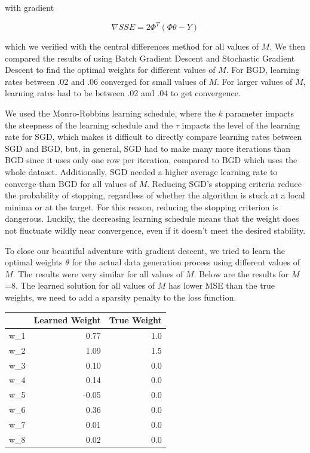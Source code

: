 \documentclass[10pt]{article}
\begin{document}
with gradient 

\begin{equation*}
	\nabla SSE = 2\Phi^T(\Phi \theta-Y)
\end{equation*}

 which we verified with the central differences method for all values of $M$. We then compared the results of using Batch Gradient Descent and Stochastic Gradient Descent to find the optimal weights for different values of $M$. For BGD, learning rates between .02 and .06 converged for small values of $M$. For larger values of $M$,  learning rates had to be between .02 and .04 to get convergence.
 
We used the Monro-Robbins learning schedule, where  the $k$ parameter impacts the steepness of the learning schedule and the $\tau$ impacts the level of the learning rate for SGD, which makes it difficult to directly compare learning rates between SGD and BGD, but, in general, SGD had to make many more iterations than BGD since it uses only one row per iteration, compared to BGD which uses the whole dataset. Additionally, SGD needed a higher average learning rate to converge than BGD for all values of $M$.
 Reducing SGD's stopping criteria reduce the probability of stopping, regardless of whether the algorithm is stuck at a local minima or at the target. For this reason, reducing the stopping criterion is dangerous. Luckily, the decreasing learning schedule means that the weight does not fluctuate wildly near convergence, even if it doesn't meet the desired stability. 
 

To close our beautiful adventure with gradient descent, we tried to learn the optimal weights $\theta$ for the actual data generation process using different values of $M$. The results were very similar for all values of $M$. Below are the results for $M$=8.  The learned solution for all values of $M$ has lower MSE than the true weights,  we need to add a sparsity penalty to the loss function.

\begin{centering}
\begin{table}

\begin{tabular}{lrr}
\toprule
{} &  Learned Weight &  True Weight \\
\midrule
w\_1 &            0.77 &          1.0 \\
w\_2 &            1.09 &          1.5 \\
w\_3 &            0.10 &          0.0 \\
w\_4 &            0.14 &          0.0 \\
w\_5 &           -0.05 &          0.0 \\
w\_6 &            0.36 &          0.0 \\
w\_7 &            0.01 &          0.0 \\
w\_8 &            0.02 &          0.0 \\
\bottomrule
\end{tabular}

\end{table}
\end{centering}
\end{document}
